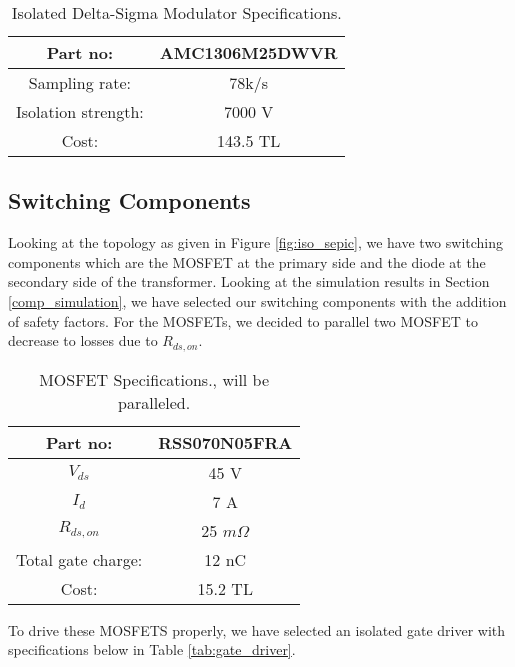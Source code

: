 \begin{table}[H]
    \centering
    \caption{Isolated Delta-Sigma Modulator Specifications.\cite{web:AMC}}
    \label{tab:AMC}
    \begin{tabular}{|c|c|}
        \hline
        Part no:                & AMC1306M25DWVR    \\
        \hline
        Sampling rate:          & 78k/s             \\
        \hline
        Isolation strength:     & 7000 V            \\
        \hline
        Cost:                   & 143.5 TL          \\
        \hline
    \end{tabular}
\end{table}


\subsection{Switching Components}
Looking at the topology as given in Figure \ref{fig:iso_sepic}, we have two switching components which are the MOSFET at the primary side and the diode at the secondary side of the transformer. Looking at the simulation results in Section \ref{comp_simulation}, we have selected our switching components with the addition of safety factors. For the MOSFETs, we decided to parallel two MOSFET to decrease to losses due to $R_{ds,on}$.

\begin{table}[H]
    \centering
    \caption{MOSFET Specifications.\cite{web:mosfet}, will be paralleled.}
    \label{tab:mosfet}
    \begin{tabular}{|c|c|}
        \hline
        Part no:            &  RSS070N05FRA     \\
        \hline
        $V_{ds}$            &  45 V             \\
        \hline
        $I_d$               &  7 A              \\
        \hline
        $R_{ds,on}$         & 25 $m\Omega$      \\
        \hline
        Total gate charge:  & 12 nC             \\
        \hline
        Cost:               & 15.2 TL           \\
        \hline
    \end{tabular} 
\end{table}

To drive these MOSFETS properly, we have selected an isolated gate driver with specifications below in Table \ref{tab:gate_driver}.

